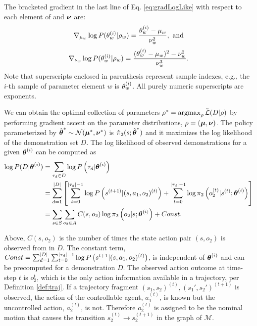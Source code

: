     \par
    The bracketed gradient in the last line of Eq. \ref{eq:gradLogLike} with respect to each element of \vect{\mu} and
    $\boldsymbol{\mathbb{\nu}}$ are:
    \[
    \nabla_{\mu_{\paramIdx}}\log P(\paramElem^{(i)} | \rho_{\paramIdx}) =
        \frac{\paramElem^{(i)} - \mu_{\paramIdx}}{\nu_{\paramIdx}^2},\ \text{and}
    \]
    \[
    \nabla_{\nu_{w}}\log P(\theta_{w}^{(i)} | \rho_{w}) = \frac{(\theta_{w}^{(i)} - \mu_{w})^2 -
        \nu_{w}^2}{\nu_{w}^3}.
    \]
    Note that superscripts enclosed in parenthesis represent sample indexes, e.g., the $i$-th sample of parameter
    element $w$ is $\theta_{w}^{(i)}$. All purely numeric superscripts are exponents.

    We can obtain the optimal collection of parameters $\rho^*= \mathop{\mathrm{argmax}}_{\rho} \tilde{\mathcal{L}{}}(D|\rho)$ by
    performing gradient ascent on the parameter distributions, $\rho = (\boldsymbol{\mathbb{\mu}}, \boldsymbol{\mathbb{\nu}})$. The policy
    parameterized by $\hat{\boldsymbol{\mathbb{\theta}}}^* \sim \mathcal{N}(\boldsymbol{\mathbb{\mu}}^*, \boldsymbol{\mathbb{\nu}}^*)$ is
    $\hat{\pi_{}}_{2}(s; \hat{\boldsymbol{\mathbb{\theta}}}^*)$ and it maximizes the log likelihood of the
    demonstration set $D$. The log likelihood of observed demonstrations for a given $\boldsymbol{\mathbb{\theta}}^{(i)}$ can be computed
    as
    \begin{align}\label{eq:log_prob_demo}
        \log P(D|\boldsymbol{\mathbb{\theta}}^{(i)}) & = \sum_{\tau_d \in D} \log P\left(\tau_d |\boldsymbol{\mathbb{\theta}}^{(i)}\right)\\
        & = \sum_{d=1}^{\lvert D\rvert} \left[ \sum_{t=0}^{\lvert\tau_d\rvert-1} \log P \left(s^{(t+1)}|(s, a_1, o_2)^{(t)}\right) +
            \sum_{t=0}^{\lvert\tau_d\rvert-1} \log \pi_{2}\left(o_2^{(t)}|s^{(t)}; \boldsymbol{\mathbb{\theta}}^{(i)}\right) \right]\\
        & = \sum_{s\in S}\sum_{o_2\in A} C(s, o_2) \log \pi_{2}\left(o_2|s; \boldsymbol{\mathbb{\theta}}^{(i)}\right) + Const.
    \end{align}

    Above, $C(s, o_2)$ is the number of times the state action pair $(s,o_2)$ is observed from in $D$. The constant
    term, $Const =\sum_{d=1}^{\lvert D\rvert} \sum_{t=0}^{\lvert\tau_d\rvert-1} \log P\left(s^{t+1}|(s ,a_1,o_2)^{(t)}\right)$, is
    independent of $\boldsymbol{\mathbb{\theta}}^{(i)}$ and can be precomputed for a demonstration $D$. The observed action outcome at
    time-step $t$ is $o_2^t$, which is the only action information available in a trajectory, per Definition
    \ref{def:traj}. If a trajectory fragment $(s_1, s_2)^{(t)}, (s_1', s_2')^{(t+1)}$ is observed, the action of the
    controllable agent, $a_1^{(t)}$, is known but the uncontrolled action, $a_2^{(t)}$, is not. Therefore $o_2^{(t)}$ is
    assigned to be the nominal motion that causes the transition $s_2^{(t)} \rightarrow s_2^{(t+1)}$ in the graph of
    $\mathcal{M}$.

